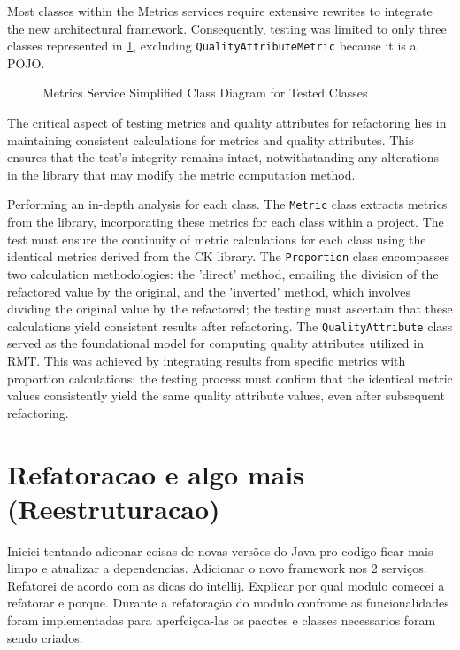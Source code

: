 Most classes within the Metrics services require extensive rewrites to integrate the new architectural framework. Consequently, testing was limited to only three classes represented in \cref{fig-class-metrics-quality}, excluding \texttt{QualityAttributeMetric} because it is a POJO.

\begin{figure}[ht!]
\SetCaptionWidth{\textwidth}
\caption{Metrics Service Simplified Class Diagram for Tested Classes}
\label{fig-class-metrics-quality}

\end{figure}
\FloatBarrier

The critical aspect of testing metrics and quality attributes for refactoring lies in maintaining consistent calculations for metrics and quality attributes. This ensures that the test's integrity remains intact, notwithstanding any alterations in the library that may modify the metric computation method.

Performing an in-depth analysis for each class. The \texttt{Metric} class extracts metrics from the \textcite{ck} library, incorporating these metrics for each class within a project. The test must ensure the continuity of metric calculations for each class using the identical metrics derived from the CK library. The \texttt{Proportion} class encompasses two calculation methodologies: the 'direct' method, entailing the division of the refactored value by the original, and the 'inverted' method, which involves dividing the original value by the refactored; the testing must ascertain that these calculations yield consistent results after refactoring. The \texttt{QualityAttribute} class served as the foundational model for computing quality attributes utilized in RMT. This was achieved by integrating results from specific metrics with proportion calculations; the testing process must confirm that the identical metric values consistently yield the same quality attribute values, even after subsequent refactoring.

\section{Refatoracao e algo mais (Reestruturacao)}

Iniciei tentando adiconar coisas de novas versões do Java pro codigo ficar mais limpo e atualizar a dependencias.
Adicionar o novo framework nos 2 serviços.
Refatorei de acordo com as dicas do intellij.
Explicar por qual modulo comecei a refatorar e porque. Durante a refatoração do modulo confrome as funcionalidades foram implementadas para aperfeiçoa-las os pacotes e classes necessarios foram sendo criados.

